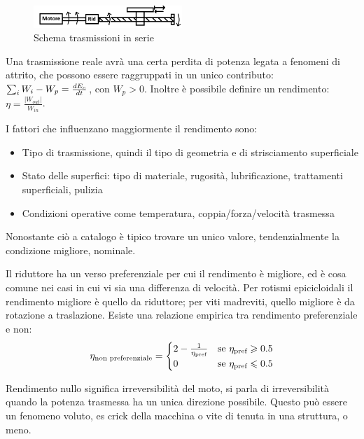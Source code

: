 \begin{figure}[h]
    \centering
    \includegraphics[width=0.5\textwidth]{Immagini/mrc_vite_madrevite.png}
    \caption{Schema trasmissioni in serie}
\end{figure}


Una trasmissione reale avrà una certa perdita di potenza legata a fenomeni di attrito, che possono essere raggruppati in un unico contributo: $\sum_i W_i - W_p = \frac{dE_c}{dt}$, con $W_p>0$.
Inoltre è possibile definire un rendimento: $\eta=\frac{|W_{out}|}{W_{in}}$.

I fattori che influenzano maggiormente il rendimento sono:
\begin{itemize}
    \item Tipo di trasmissione, quindi il tipo di geometria e di strisciamento superficiale
    \item Stato delle superfici: tipo di materiale, rugosità, lubrificazione, trattamenti superficiali, pulizia
    \item Condizioni operative come temperatura, coppia/forza/velocità trasmessa
\end{itemize}
Nonostante ciò a catalogo è tipico trovare un unico valore, tendenzialmente la condizione migliore, nominale.

Il riduttore ha un verso preferenziale per cui il rendimento è migliore, ed è cosa comune nei casi in cui vi sia una differenza di velocità.
Per rotismi epicicloidali il rendimento migliore è quello da riduttore; per viti madreviti, quello migliore è da rotazione a traslazione.
Esiste una relazione empirica tra rendimento preferenziale e non:
\[
\eta_\textup{non preferenziale} = 
\begin{cases} 
    2 - \frac{1}{\eta_\textup{pref}} & \text{se } \eta_\textup{pref} \geqslant 0.5 \\
    0 & \text{se } \eta_\textup{pref} \leqslant 0.5
\end{cases}
\]

Rendimento nullo significa irreversibilità del moto, si parla di irreversibilità quando la potenza trasmessa ha un unica direzione possibile. Questo può essere un fenomeno voluto, es crick della macchina o vite di tenuta in una struttura, o meno.

